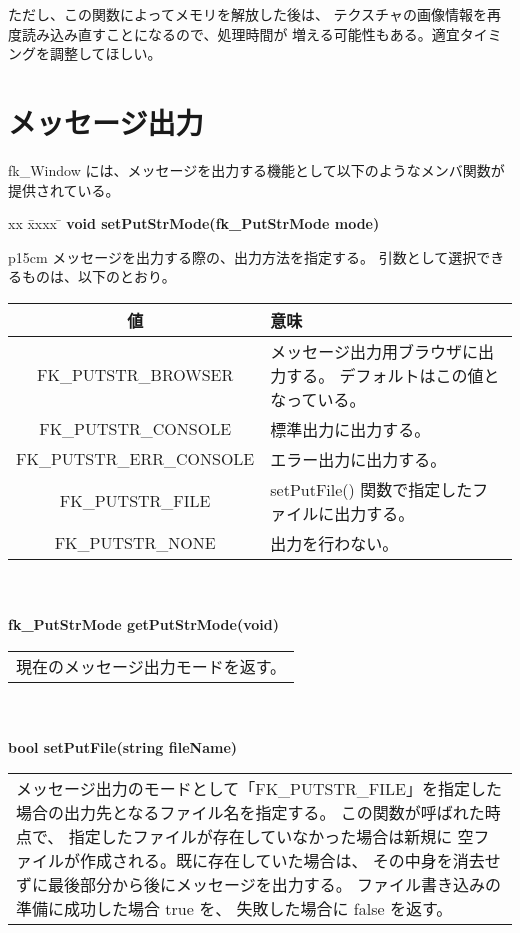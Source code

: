 ただし、この関数によってメモリを解放した後は、
テクスチャの画像情報を再度読み込み直すことになるので、処理時間が
増える可能性もある。適宜タイミングを調整してほしい。

\section{メッセージ出力} \label{sec:winmessage}
fk\_Window には、メッセージを出力する機能として以下のようなメンバ関数が
提供されている。
\begin{tabbing}
xx \= xxxx \= \kill
\> \textbf{void setPutStrMode(fk\_PutStrMode mode)} \\
	\> \> \begin{tabular}{p{15cm}}
		メッセージを出力する際の、出力方法を指定する。
		引数として選択できるものは、以下のとおり。
		\begin{center}
		\begin{tabular}{|c|p{8cm}|}
		\hline
		値 & 意味 \\ \hline
		FK\_PUTSTR\_BROWSER &
			メッセージ出力用ブラウザに出力する。
			デフォルトはこの値となっている。\\ \hline
		FK\_PUTSTR\_CONSOLE &
			標準出力に出力する。\\ \hline
		FK\_PUTSTR\_ERR\_CONSOLE &
			エラー出力に出力する。\\ \hline
		FK\_PUTSTR\_FILE &
			setPutFile() 関数で指定したファイルに出力する。\\ \hline
		FK\_PUTSTR\_NONE &
			出力を行わない。\\ \hline
		\end{tabular}
		\end{center}
	\end{tabular} \\ \\
\> \textbf{fk\_PutStrMode getPutStrMode(void)} \\
	\> \> \begin{tabular}{p{15cm}}
		現在のメッセージ出力モードを返す。
	\end{tabular} \\ \\

\> \textbf{bool setPutFile(string fileName)} \\
	\> \> \begin{tabular}{p{15cm}}
		メッセージ出力のモードとして「FK\_PUTSTR\_FILE」を指定した
		場合の出力先となるファイル名を指定する。
		この関数が呼ばれた時点で、
		指定したファイルが存在していなかった場合は新規に
		空ファイルが作成される。既に存在していた場合は、
		その中身を消去せずに最後部分から後にメッセージを出力する。
		ファイル書き込みの準備に成功した場合 true を、
		失敗した場合に false を返す。
	\end{tabular} \\ \\


\end{tabbing}
